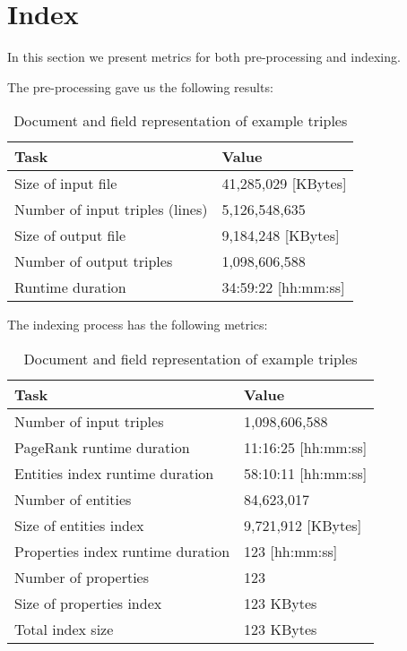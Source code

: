 \section{Index}

In this section we present metrics for both pre-processing and indexing.

The pre-processing gave us the following results:

\begin{table}[h!]
\centering
\begin{tabular}{ll}
Task                                    & Value                     \\
\hline
Size of input file                      & 41,285,029 [KBytes]       \\
Number of input triples (lines)         & 5,126,548,635             \\
Size of output file                     & 9,184,248 [KBytes]        \\
Number of output triples                & 1,098,606,588             \\
Runtime duration                        & 34:59:22 [hh:mm:ss]       \\
\end{tabular}
\caption{Document and field representation of example triples}
\label{table:preprocessingMetrics}
\end{table}

The indexing process has the following metrics:

\begin{table}[h!]
\centering
\begin{tabular}{ll}
Task                                    & Value                      \\
\hline
Number of input triples                 & 1,098,606,588              \\
PageRank runtime duration               & 11:16:25 [hh:mm:ss]        \\
Entities index runtime duration         & 58:10:11 [hh:mm:ss]        \\
Number of entities                      & 84,623,017                 \\
Size of entities index                  & 9,721,912 [KBytes]         \\
Properties index runtime duration       & 123 [hh:mm:ss]             \\
Number of properties                    & 123                        \\
Size of properties index                & 123 KBytes                 \\
Total index size                        & 123 KBytes                 \\
\end{tabular}
\caption{Document and field representation of example triples}
\label{table:indexMetrics}
\end{table}

